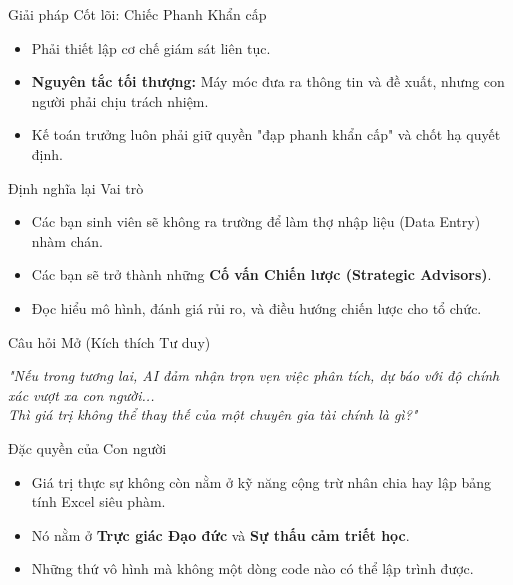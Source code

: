 \documentclass[aspectratio=169,12pt]{beamer}
\begin{document}
\begin{frame}{Giải pháp Cốt lõi: Chiếc Phanh Khẩn cấp}
    \begin{itemize}
        \item Phải thiết lập cơ chế giám sát liên tục.
        \item \textbf{Nguyên tắc tối thượng:} Máy móc đưa ra thông tin và đề xuất, nhưng con người phải chịu trách nhiệm.
        \item Kế toán trưởng luôn phải giữ quyền "đạp phanh khẩn cấp" và chốt hạ quyết định.
    \end{itemize}
\end{frame}

\begin{frame}{Định nghĩa lại Vai trò}
    \begin{itemize}
        \item Các bạn sinh viên sẽ không ra trường để làm thợ nhập liệu (Data Entry) nhàm chán.
        \item Các bạn sẽ trở thành những \textbf{Cố vấn Chiến lược (Strategic Advisors)}.
        \item Đọc hiểu mô hình, đánh giá rủi ro, và điều hướng chiến lược cho tổ chức.
    \end{itemize}
\end{frame}

\begin{frame}{Câu hỏi Mở (Kích thích Tư duy)}
    \begin{center}
        \textit{"Nếu trong tương lai, AI đảm nhận trọn vẹn việc phân tích, dự báo với độ chính xác vượt xa con người... \\
        Thì giá trị không thể thay thế của một chuyên gia tài chính là gì?"}
    \end{center}
\end{frame}

\begin{frame}{Đặc quyền của Con người}
    \begin{itemize}
        \item Giá trị thực sự không còn nằm ở kỹ năng cộng trừ nhân chia hay lập bảng tính Excel siêu phàm.
        \item Nó nằm ở \textbf{Trực giác Đạo đức} và \textbf{Sự thấu cảm triết học}.
        \item Những thứ vô hình mà không một dòng code nào có thể lập trình được.
    \end{itemize}
\end{frame}
\end{document}
